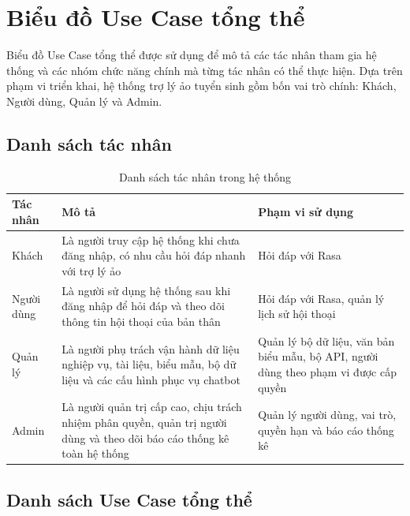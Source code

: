 \section{Biểu đồ Use Case tổng thể}

Biểu đồ Use Case tổng thể được sử dụng để mô tả các tác nhân tham gia hệ thống và các nhóm chức năng chính mà từng tác nhân có thể thực hiện. Dựa trên phạm vi triển khai, hệ thống trợ lý ảo tuyển sinh gồm bốn vai trò chính: Khách, Người dùng, Quản lý và Admin.

\subsection{Danh sách tác nhân}
\begin{table}[H]
\centering
\caption{Danh sách tác nhân trong hệ thống}
\label{tab:actors_list}
\begin{tabular}{|p{3.2cm}|p{6.8cm}|p{5cm}|}
\hline
\textbf{Tác nhân} & \textbf{Mô tả} & \textbf{Phạm vi sử dụng} \\ \hline
Khách & Là người truy cập hệ thống khi chưa đăng nhập, có nhu cầu hỏi đáp nhanh với trợ lý ảo & Hỏi đáp với Rasa \\ \hline
Người dùng & Là người sử dụng hệ thống sau khi đăng nhập để hỏi đáp và theo dõi thông tin hội thoại của bản thân & Hỏi đáp với Rasa, quản lý lịch sử hội thoại \\ \hline
Quản lý & Là người phụ trách vận hành dữ liệu nghiệp vụ, tài liệu, biểu mẫu, bộ dữ liệu và các cấu hình phục vụ chatbot & Quản lý bộ dữ liệu, văn bản biểu mẫu, bộ API, người dùng theo phạm vi được cấp quyền \\ \hline
Admin & Là người quản trị cấp cao, chịu trách nhiệm phân quyền, quản trị người dùng và theo dõi báo cáo thống kê toàn hệ thống & Quản lý người dùng, vai trò, quyền hạn và báo cáo thống kê \\ \hline
\end{tabular}
\end{table}

\subsection{Danh sách Use Case tổng thể}

